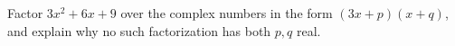 Factor $ 3x^2+6x+9 $ over the complex numbers in the form $(3x+p)(x+q)$, and explain why no such factorization has both $ p,q $ real.
